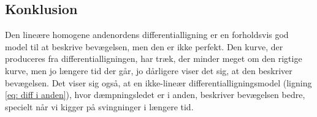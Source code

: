 \subsection{Konklusion}
Den lineære homogene andenordens differentialligning er en forholdsvis god model til at beskrive bevægelsen, men den er ikke perfekt. 
Den kurve, der produceres fra differentialligningen, har træk, der minder meget om den rigtige kurve, men jo længere tid der går, jo dårligere viser det sig, at den beskriver bevægelsen. 
Det viser sig også, at en ikke-lineær differentialligningsmodel (ligning \ref{eq: diff i anden}), hvor dæmpningsledet er i anden, beskriver bevægelsen bedre, specielt når vi kigger på svingninger i længere tid.

